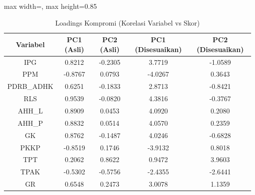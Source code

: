 \begin{table}[H]
\centering
\caption{Loadings Kompromi (Korelasi Variabel vs Skor)} \label{tab:apploadings}
\begin{adjustbox}{max width=\textwidth, max height=0.85\textheight}
\begin{tabular}{|c|c|c|c|c|}
\hline
\textbf{Variabel} & \textbf{PC1 (Asli)} & \textbf{PC2 (Asli)} & \textbf{PC1 (Disesuaikan)} & \textbf{PC2 (Disesuaikan)} \\
\hline
IPG & 0.8212 & -0.2305 & 3.7719 & -1.0589 \\
PPM & -0.8767 & 0.0793 & -4.0267 & 0.3643 \\
PDRB\_ADHK & 0.6251 & -0.1833 & 2.8713 & -0.8421 \\
RLS & 0.9539 & -0.0820 & 4.3816 & -0.3767 \\
AHH\_L & 0.8909 & 0.0453 & 4.0920 & 0.2080 \\
AHH\_P & 0.8832 & 0.0514 & 4.0570 & 0.2359 \\
GK & 0.8762 & -0.1487 & 4.0246 & -0.6828 \\
PKKP & -0.8519 & 0.1746 & -3.9132 & 0.8018 \\
TPT & 0.2062 & 0.8622 & 0.9472 & 3.9603 \\
TPAK & -0.5302 & -0.5756 & -2.4355 & -2.6441 \\
GR & 0.6548 & 0.2473 & 3.0078 & 1.1359 \\
\hline
\end{tabular}
\end{adjustbox}
\end{table}